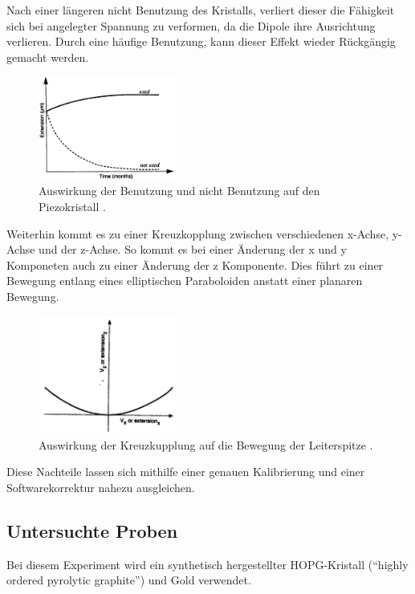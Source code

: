 Nach einer längeren nicht Benutzung des Kristalls, verliert dieser die Fähigkeit sich bei angelegter Spannung zu verformen, da die Dipole ihre Ausrichtung verlieren.
Durch eine häufige Benutzung, kann dieser Effekt wieder Rückgängig gemacht werden.
\begin{figure}[!h]
    \centering
    \includegraphics[width=0.4\textwidth]{images/aging.JPG}
    \caption{Auswirkung der Benutzung und nicht Benutzung auf den Piezokristall \cite{STM-Literatur}.}
\end{figure}

Weiterhin kommt es zu einer Kreuzkopplung zwischen verschiedenen x-Achse, y-Achse und der z-Achse.
So kommt es bei einer Änderung der x und y Komponeten auch zu einer Änderung der z Komponente.
Dies führt zu einer Bewegung entlang eines elliptischen Paraboloiden anstatt einer planaren Bewegung.
\begin{figure}[!h]
    \centering
    \includegraphics[width=0.4\textwidth]{images/Kreuzkupplung.JPG}
    \caption{Auswirkung der Kreuzkupplung auf die Bewegung der Leiterspitze \cite{STM-Literatur}.}
\end{figure}

Diese Nachteile lassen sich mithilfe einer genauen Kalibrierung und einer Softwarekorrektur nahezu ausgleichen.

\subsection{Untersuchte Proben} %
\label{sub:proben}

Bei diesem Experiment wird ein synthetisch hergestellter HOPG-Kristall ("`highly ordered pyrolytic graphite"') und Gold verwendet.

